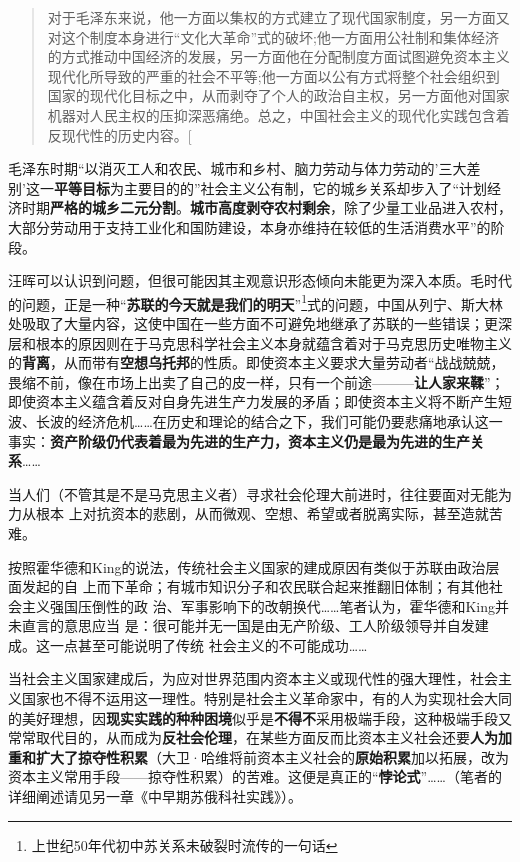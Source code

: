 \begin{quotation}
对于毛泽东来说，他一方面以集权的方式建立了现代国家制度，另一方面又对这个制度本身进行“文化大革命”式的破坏;他一方面用公社制和集体经济的方式推动中国经济的发展，另一方面他在分配制度方面试图避免资本主义现代化所导致的严重的社会不平等;他一方面以公有方式将整个社会组织到国家的现代化目标之中，从而剥夺了个人的政治自主权，另一方面他对国家机器对人民主权的压抑深恶痛绝。总之，中国社会主义的现代化实践包含着反现代性的历史内容。{[}\cite{wangxiandai}
\end{quotation}

毛泽东时期“以消灭工人和农民、城市和乡村、脑力劳动与体力劳动的'三大差别'这一\textbf{平等目标}为主要目的的”社会主义公有制，它的城乡关系却步入了“计划经济时期\textbf{严格的城乡二元分割}。\textbf{城市高度剥夺农村剩余}，除了少量工业品进入农村，大部分劳动用于支持工业化和国防建设，本身亦维持在较低的生活消费水平”\cite{yangkongjian}的阶段。

汪晖可以认识到问题，但很可能因其主观意识形态倾向未能更为深入本质。毛时代的问题，正是一种“\textbf{苏联的今天就是我们的明天}”\footnote{上世纪50年代初中苏关系未破裂时流传的一句话}式的问题，中国从列宁、斯大林处吸取了大量内容，这使中国在一些方面不可避免地继承了苏联的一些错误；更深层和根本的原因则在于马克思科学社会主义本身就蕴含着对于马克思历史唯物主义的\textbf{背离}，从而带有\textbf{空想乌托邦}的性质。即使资本主义要求大量劳动者“战战兢兢，畏缩不前，像在市场上出卖了自己的皮一样，只有一个前途---------\textbf{让人家来鞣}”；即使资本主义蕴含着反对自身先进生产力发展的矛盾；即使资本主义将不断产生短波、长波的经济危机\ldots{}\ldots{}在历史和理论的结合之下，我们可能仍要悲痛地承认这一事实：\textbf{资产阶级仍代表着最为先进的生产力，资本主义仍是最为先进的生产关系}\ldots{}\ldots{}

当人们（不管其是不是马克思主义者）寻求社会伦理大前进时，往往要面对无能为力从根本
上对抗资本的悲剧，从而微观、空想、希望或者脱离实际，甚至造就苦难。

按照霍华德和King的说法，传统社会主义国家的建成原因有类似于苏联由政治层面发起的自
上而下革命；有城市知识分子和农民联合起来推翻旧体制；有其他社会主义强国压倒性的政
治、军事影响下的改朝换代\ldots{}\ldots{}笔者认为，霍华德和King并未直言的意思应当
是：很可能并无一国是由无产阶级、工人阶级领导并自发建成。这一点甚至可能说明了传统
社会主义的不可能成功\ldots{}\ldots{}


当社会主义国家建成后，为应对世界范围内资本主义或现代性的强大理性，社会主义国家也不得不运用这一理性。特别是社会主义革命家中，有的人为实现社会大同的美好理想，因\textbf{现实实践的种种困境}似乎是\textbf{不得不}采用极端手段，这种极端手段又常常取代目的，从而成为\textbf{反社会伦理}，在某些方面反而比资本主义社会还要\textbf{人为加重和扩大了掠夺性积累}（大卫·哈维将前资本主义社会的\textbf{原始积累}加以拓展，改为资本主义常用手段------掠夺性积累）的苦难。这便是真正的“\textbf{悖论式}”\ldots{}\ldots{}（笔者的详细阐述请见另一章《中早期苏俄科社实践》）。

